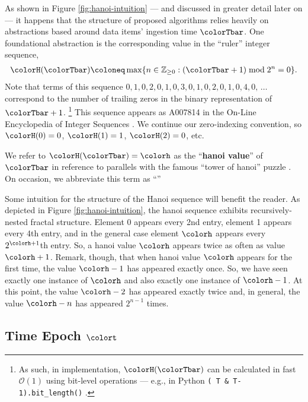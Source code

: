 As shown in Figure \ref{fig:hanoi-intuition} --- and discussed in greater detail later on --- it happens that the structure of proposed algorithms relies heavily on abstractions based around data items' ingestion time $\colorTbar$.
One foundational abstraction is the corresponding value in the ``ruler'' integer sequence,
\begin{align}
\colorH(\colorTbar)
\coloneq
\max \{ n \in \mathbb{Z}_{\geq0} : (\colorTbar + 1) \bmod 2^n = 0 \}.
\label{eqn:hanoi-defn}
\end{align}
Note that terms of this sequence $0,\allowbreak 1,\allowbreak 0,\allowbreak 2,\allowbreak 0,\allowbreak 1,\allowbreak 0,\allowbreak 3,\allowbreak 0,\allowbreak 1,\allowbreak 0,\allowbreak 2,\allowbreak 0,\allowbreak 1,\allowbreak 0,\allowbreak 4,\allowbreak 0,\allowbreak \,\ldots$ correspond to the number of trailing zeros in the binary representation of $\colorTbar + 1$.%
\footnote{%
As such, in implementation, $\colorH(\colorTbar)$ can be calculated in fast $\mathcal{O}(1)$ using bit-level operations --- e.g., in Python \texttt{(~T \& T-1).bit\_length()} \citep{oeis}.
}
This sequence appears as A007814 in the On-Line Encyclopedia of Integer Sequences \citep{oeis}.
We continue our zero-indexing convention, so $\colorH(0) = 0$, $\colorH(1) = 1$, $\colorH(2) = 0$, etc.

We refer to $\colorH(\colorTbar) = \colorh$ as the ``\textbf{hanoi value}'' of $\colorTbar$ in reference to parallels with the famous ``tower of hanoi'' puzzle \citep{lucas1889jeux}.
On occasion, we abbreviate this term as ``\hv{}''

Some intuition for the structure of the Hanoi sequence will benefit the reader.
As depicted in Figure \ref{fig:hanoi-intuition}, the hanoi sequence exhibits recursively-nested fractal structure.
Element 0 appears every 2nd entry, element 1 appears every 4th entry, and in the general case element $\colorh$ appears every $2^{\colorh+1}$th entry.
So, a hanoi value $\colorh$ appears twice as often as value $\colorh + 1$.
Remark, though, that when hanoi value $\colorh$ appears for the first time, the value $\colorh - 1$ has appeared exactly once.
So, we have seen exactly one instance of $\colorh$ and also exactly one instance of $\colorh - 1$.
At this point, the value $\colorh - 2$ has appeared exactly twice and, in general, the value $\colorh - n$ has appeared $2^{n - 1}$ times.

\subsection{Time Epoch $\colort$}
\label{sec:notation-epoch}

